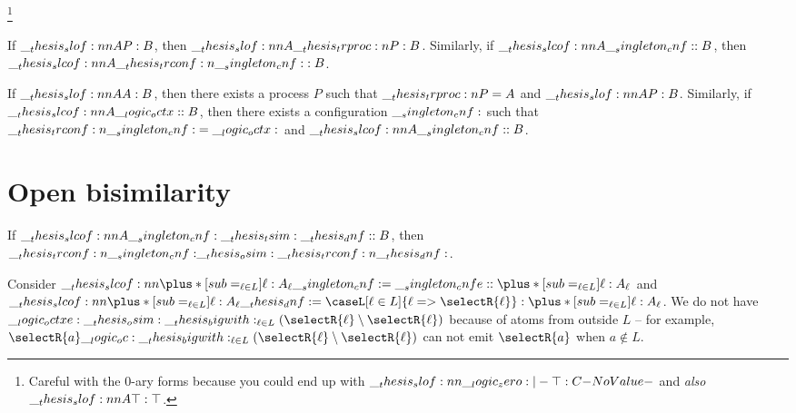 \footnote{Careful with the 0-ary forms because you could end up with $\slof{\zero |- \top : C}$ and \emph{also} $\slof{A |- \top : \top}$.}

\begin{theorem}
  If $\slof{A |- P : B}$, then $\slof{A |- \trproc{P} : B}$.
  Similarly, if $\slcof{A |- \cnf : B}$, then $\slcof{A |- \trconf{\cnf} : B}$.
\end{theorem}

\begin{theorem}
  If $\slof{A |- A : B}$, then there exists a process $P$ such that $\__thesis_trproc:n {P} = A$ and $\slof{A |- P : B}$.
  Similarly, if $\slcof{A |- \octx : B}$, then there exists a configuration $\__singleton_cnf:$ such that $\__thesis_trconf:n {\__singleton_cnf:} = \__logic_octx:$ and $\slcof{A |- \cnf : B}$.
\end{theorem}

\section{Open bisimilarity}

\begin{falseclaim}
  If $\slcof{A |- \cnf \tsim \dnf : B}$, then $\__thesis_trconf:n {\__singleton_cnf:} \__thesis_osim: \__thesis_trconf:n {\__thesis_dnf:}$.
\end{falseclaim}

Consider $\slcof{\plus*[sub=_{\ell \in L}]{\ell:A_{\ell}} |- \cnf = \cnfe : \plus*[sub=_{\ell \in L}]{\ell:A_{\ell}}}$ and $\slcof{\plus*[sub=_{\ell \in L}]{\ell:A_{\ell}} |- \dnf = \caseL[\ell \in L]{\ell => \selectR{\ell}} : \plus*[sub=_{\ell \in L}]{\ell:A_{\ell}}}$.
We do not have $\octxe \osim \bigwith_{\ell \in L}(\selectR{\ell} \limp \selectR{\ell})$ because of atoms from outside $L$ -- for example, $\selectR{a} \oc \bigwith_{\ell \in L}(\selectR{\ell} \limp \selectR{\ell})$ can not emit $\selectR{a}$ when $a \notin L$.

